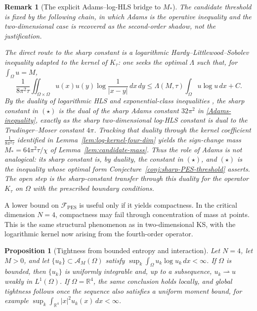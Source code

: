 \documentclass[pdflatex,sn-mathphys-num]{sn-jnl}%
\theoremstyle{thmstyleone}
\newtheorem{proposition}[theorem]{Proposition}%
\theoremstyle{thmstyletwo}
\newtheorem{remark}{Remark}
\theoremstyle{thmstylethree}
\begin{document}
\begin{remark}[The explicit Adams--log-HLS bridge to \(M_*\)]
\label{rem:adams-loghls-bridge}
The candidate threshold is fixed by the following chain, in which Adams is the
operative inequality and the two-dimensional case is recovered as the
second-order shadow, not the justification.

The direct route to the sharp constant is a logarithmic
Hardy--Littlewood--Sobolev inequality adapted to the kernel of \(K_\tau\): one
seeks the optimal \(\Lambda\) such that, for \(\int_\Omega u=M\),
\[
   \frac{1}{8\pi^2\tau}\iint_{\Omega\times\Omega}
        u(x)u(y)\log\frac{1}{|x-y|}\,dx\,dy
   \le
   \Lambda(M,\tau)\int_\Omega u\log u\,dx+C .
\tag{$\star$}
\]
By the duality of logarithmic HLS and exponential-class inequalities
\cite{carlen1992competing}, the sharp constant in \((\star)\) is the dual of
the sharp Adams constant \(32\pi^2\) in \eqref{Adams-inequality}, exactly as the
sharp two-dimensional log-HLS constant is dual to the Trudinger--Moser constant
\(4\pi\). Tracking that duality through the kernel coefficient
\(\frac{1}{8\pi^2\tau}\) identified in
Lemma~\ref{lem:log-kernel-four-dim} yields the sign-change mass
\(M_*=64\pi^2\tau/\chi\) of Lemma~\ref{lem:candidate-mass}. Thus the role of
Adams is not analogical: its sharp constant is, by duality, the constant in
\((\star)\), and \((\star)\) is the inequality whose optimal form
Conjecture~\ref{conj:sharp-PES-threshold} asserts. The open step is the
sharp-constant transfer through this duality for the operator
\(K_\tau\) on \(\Omega\) with the prescribed boundary conditions.
\end{remark}

A lower bound on \(\mathcal F_{\mathrm{PES}}\) is useful only if it yields
compactness.  In the critical dimension \(N=4\), compactness may fail through
concentration of mass at points.  This is the same structural phenomenon as in
two-dimensional KS, with the logarithmic kernel now arising from the
fourth-order operator.

\begin{proposition}[Tightness from bounded entropy and interaction]
\label{prop:tightness}
Let \(N=4\), let \(M>0\), and let \(\{u_k\}\subset\mathcal A_M(\Omega)\) satisfy
\(\sup_k\int_\Omega u_k\log u_k\,dx<\infty\).  If \(\Omega\) is bounded, then
\(\{u_k\}\) is uniformly integrable and, up to a subsequence,
\(u_k\rightharpoonup u\) weakly in \(L^1(\Omega)\).  If \(\Omega=\mathbb R^4\),
the same conclusion holds locally, and global tightness follows once the
sequence also satisfies a uniform moment bound, for example
\(\sup_k\int_{\mathbb R^4}|x|^2u_k(x)\,dx<\infty\).
\end{proposition}
\end{document}
